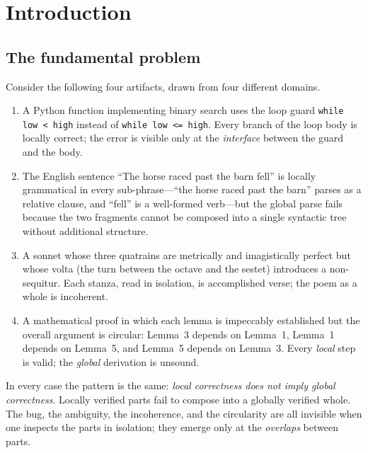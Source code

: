 
\chapter{Introduction}
\label{ch:intro}

\section{The fundamental problem}
\label{sec:intro:problem}

Consider the following four artifacts, drawn from four different domains.

\begin{enumerate}[label=(\roman*)]
\item A Python function implementing binary search uses the loop guard
  \texttt{while low < high} instead of \texttt{while low <= high}.
  Every branch of the loop body is locally correct; the error is
  visible only at the \emph{interface} between the guard and the body.

\item The English sentence ``The horse raced past the barn fell'' is
  locally grammatical in every sub-phrase---``the horse raced past the
  barn'' parses as a relative clause, and ``fell'' is a well-formed
  verb---but the global parse fails because the two fragments cannot
  be composed into a single syntactic tree without additional
  structure.

\item A sonnet whose three quatrains are metrically and imagistically
  perfect but whose volta (the turn between the octave and the sestet)
  introduces a non-sequitur.  Each stanza, read in isolation, is
  accomplished verse; the poem as a whole is incoherent.

\item A mathematical proof in which each lemma is impeccably
  established but the overall argument is circular: Lemma~3 depends on
  Lemma~1, Lemma~1 depends on Lemma~5, and Lemma~5 depends on
  Lemma~3.  Every \emph{local} step is valid; the \emph{global}
  derivation is unsound.
\end{enumerate}

In every case the pattern is the same: \emph{local correctness does
not imply global correctness}.  Locally verified parts fail to compose
into a globally verified whole.  The bug, the ambiguity, the
incoherence, and the circularity are all invisible when one inspects
the parts in isolation; they emerge only at the \emph{overlaps}
between parts.

